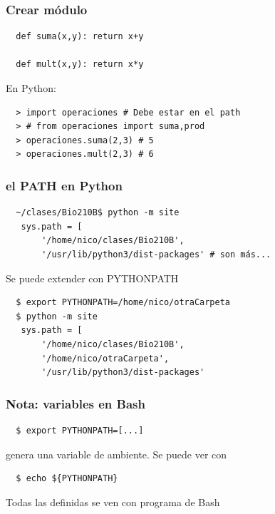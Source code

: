 \documentclass[14pt,aspectratio=169,xcolor=dvipsnames]{beamer}
\begin{document}
\begin{frame}[fragile]\frametitle{Crear módulo}
    \begin{verbatim}
  def suma(x,y): return x+y

  def mult(x,y): return x*y
    \end{verbatim}

  En Python:
  \begin{verbatim}
  > import operaciones # Debe estar en el path
  > # from operaciones import suma,prod
  > operaciones.suma(2,3) # 5
  > operaciones.mult(2,3) # 6
  \end{verbatim}
\end{frame}
\begin{frame}[fragile]\frametitle{el PATH en Python}
    \begin{verbatim}
  ~/clases/Bio210B$ python -m site
   sys.path = [
       '/home/nico/clases/Bio210B',
       '/usr/lib/python3/dist-packages' # son más...
    \end{verbatim}

    \pause Se puede extender con PYTHONPATH
    \begin{verbatim}
  $ export PYTHONPATH=/home/nico/otraCarpeta
  $ python -m site
   sys.path = [
       '/home/nico/clases/Bio210B',
       '/home/nico/otraCarpeta',
       '/usr/lib/python3/dist-packages'
    \end{verbatim}

\end{frame}
\begin{frame}[fragile]\frametitle{Nota: variables en Bash}
    \begin{verbatim}
  $ export PYTHONPATH=[...]
    \end{verbatim}
    genera una variable de ambiente. Se puede ver con
    \begin{verbatim}
  $ echo ${PYTHONPATH}
    \end{verbatim}
  Todas las definidas se ven con programa  de Bash

\end{frame}
\end{document}

